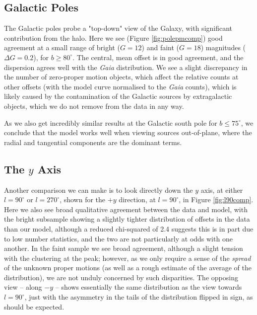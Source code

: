 \documentclass[fleqn,usenatbib]{mnras}
\begin{document}
\subsection{Galactic Poles}
The Galactic poles probe a "top-down" view of the Galaxy, with significant contribution from the halo.
Here we see (Figure \ref{fig:polepmcomp}) good agreement at a small range of bright ($G=12$) and faint ($G=18$) magnitudes ($\Delta G = 0.2$), for $b \geq 80^\circ$.
The central, mean offset is in good agreement, and the dispersion agrees well with the \textit{Gaia} distribution.
We see a slight discrepancy in the number of zero-proper motion objects, which affect the relative counts at other offsets (with the model curve normalised to the \textit{Gaia} counts), which is likely caused by the contamination of the Galactic sources by extragalactic objects, which we do not remove from the data in any way.

As we also get incredibly similar results at the Galactic south pole for $b \leq 75^\circ$, we conclude that the model works well when viewing sources out-of-plane, where the radial and tangential components are the dominant terms.

\subsection{The $y$ Axis}
Another comparison we can make is to look directly down the $y$ axis, at either $l = 90^\circ$ or $l = 270^\circ$, shown for the $+y$ direction, at $l = 90^\circ$, in Figure \ref{fig:l90comp}.
Here we also see broad qualitative agreement between the data and model, with the bright subsample showing a slightly tighter distribution of offsets in the data than our model, although a reduced chi-squared of 2.4 suggests this is in part due to low number statistics, and the two are not particularly at odds with one another.
In the faint sample we see broad agreement, although a slight tension with the clustering at the peak; however, as we only require a sense of the \textit{spread} of the unknown proper motions (as well as a rough estimate of the average of the distribution), we are not unduly concerned by such disparities.
The opposing view -- along $-y$ -- shows essentially the same distribution as the view towards $l = 90^\circ$, just with the asymmetry in the tails of the distribution flipped in sign, as should be expected.
\end{document}
